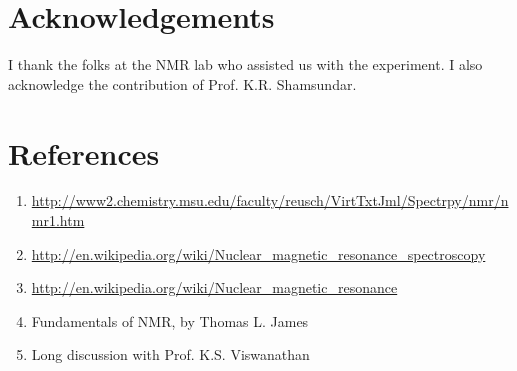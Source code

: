 \section{Acknowledgements}
I thank the folks at the NMR lab who assisted us with the experiment. I also acknowledge the contribution of Prof. K.R. Shamsundar.

\section{References}
	\begin{enumerate}
		\item \url{http://www2.chemistry.msu.edu/faculty/reusch/VirtTxtJml/Spectrpy/nmr/nmr1.htm}
		\item \url{http://en.wikipedia.org/wiki/Nuclear_magnetic_resonance_spectroscopy}
		\item \url{http://en.wikipedia.org/wiki/Nuclear_magnetic_resonance}
		\item Fundamentals of NMR, by Thomas L. James
		\item Long discussion with Prof. K.S. Viswanathan
	\end{enumerate}